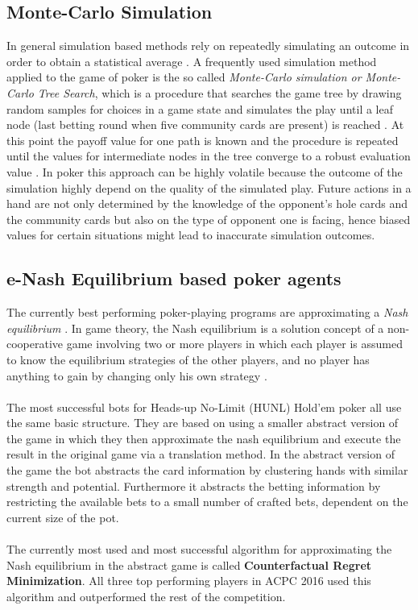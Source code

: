 \subsection{Monte-Carlo Simulation}
In general simulation based methods rely on repeatedly simulating an outcome in order to obtain a statistical average \cite{master_nuno}. A frequently used simulation method applied to the game of poker is the so called \textit{Monte-Carlo simulation or Monte-Carlo Tree Search}, which is a procedure that searches the game tree by drawing random samples for choices in a game state and simulates the play until a leaf node (last betting round when five community cards are present) is reached \cite{review}. At this point the payoff value for one path is known and the procedure is repeated until the values for intermediate nodes in the tree converge to a robust evaluation value \cite{review}.
In poker this approach can be highly volatile because the outcome of the simulation highly depend on the quality of the simulated play. Future actions in a hand are not only determined by the knowledge of the opponent's hole cards and the community cards but also on the type of opponent one is facing, hence biased values for certain situations might lead to inaccurate simulation outcomes. \cite{master_nuno}
\subsection{e-Nash Equilibrium based poker agents}
The currently best performing poker-playing programs are approximating a \textit{Nash equilibrium} \cite{nash}. In game theory, the Nash equilibrium is a solution concept of a non-cooperative game involving two or more players in which each player is assumed to know the equilibrium strategies of the other players, and no player has anything to gain by changing only his own strategy \cite{game_theory}.\\\\
The most successful bots for Heads-up No-Limit (HUNL) Hold'em poker all use the same basic structure. They are based on using a smaller abstract version of the game in which they then approximate the nash equilibrium and execute the result in the original game via a translation method. In the abstract version of the game the bot abstracts the card information by clustering hands with similar strength and potential. Furthermore it abstracts the betting information by restricting the available bets to a small number of crafted bets, dependent on the current size of the pot. \cite{nash} \\\\
The currently most used and most successful algorithm for approximating the Nash equilibrium in the abstract game is called \textbf{Counterfactual Regret Minimization}. All three top performing players in ACPC 2016 used this algorithm and outperformed the rest of the competition. \cite{nash} \\
